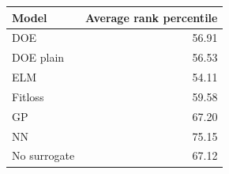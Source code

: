 \begin{tabular}{lr}
\toprule
Model & Average rank percentile \\
\midrule
DOE & 56.91 \\
DOE plain & 56.53 \\
ELM & 54.11 \\
Fitloss & 59.58 \\
GP & 67.20 \\
NN & 75.15 \\
No surrogate & 67.12 \\
\bottomrule
\end{tabular}
